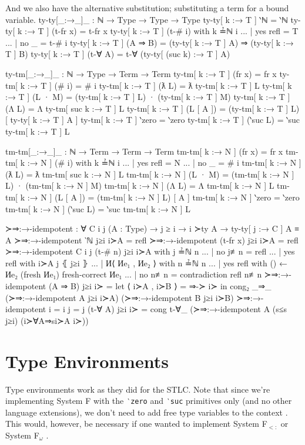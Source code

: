 \documentclass[logo,bsc,singlespacing,parskip,online]{infthesis}
\renewenvironment{code}{\mintedcopy[breaklines,breaksymbolleft=\;]{agda}}{\endmintedcopy}
\begin{document}
And we also have the alternative substitution; substituting a term for a bound variable.
\begin{code}
  ty-ty[_:→_]_ : ℕ → Type → Type → Type
  ty-ty[ k :→ T ] ‵ℕ = ‵ℕ
  ty-ty[ k :→ T ] (t-fr x) = t-fr x
  ty-ty[ k :→ T ] (t-# i) with k ≟ℕ i
  ... | yes refl = T
  ... | no  _    = t-# i
  ty-ty[ k :→ T ] (A ⇒ B) = (ty-ty[ k :→ T ] A) ⇒ (ty-ty[ k :→ T ] B)
  ty-ty[ k :→ T ] (t-∀ A) = t-∀ (ty-ty[ (suc k) :→ T ] A)

  ty-tm[_:→_]_ : ℕ → Type → Term → Term
  ty-tm[ k :→ T ] (fr x) = fr x
  ty-tm[ k :→ T ] (# i) = # i
  ty-tm[ k :→ T ] (ƛ L) = ƛ ty-tm[ k :→ T ] L
  ty-tm[ k :→ T ] (L · M) = (ty-tm[ k :→ T ] L) · (ty-tm[ k :→ T ] M)
  ty-tm[ k :→ T ] (Λ L) = Λ ty-tm[ suc k :→ T ] L
  ty-tm[ k :→ T ] (L [ A ]) = (ty-tm[ k :→ T ] L) [ ty-ty[ k :→ T ] A ]
  ty-tm[ k :→ T ] ‵zero = ‵zero
  ty-tm[ k :→ T ] (‵suc L) = ‵suc ty-tm[ k :→ T ] L

  tm-tm[_:→_]_ : ℕ → Term → Term → Term
  tm-tm[ k :→ N ] (fr x) = fr x
  tm-tm[ k :→ N ] (# i) with k ≟ℕ i
  ... | yes refl = N
  ... | no  _    = # i
  tm-tm[ k :→ N ] (ƛ L) = ƛ tm-tm[ suc k :→ N ] L
  tm-tm[ k :→ N ] (L · M) = (tm-tm[ k :→ N ] L) · (tm-tm[ k :→ N ] M)
  tm-tm[ k :→ N ] (Λ L) = Λ tm-tm[ k :→ N ] L
  tm-tm[ k :→ N ] (L [ A ]) = (tm-tm[ k :→ N ] L) [ A ]
  tm-tm[ k :→ N ] ‵zero = ‵zero
  tm-tm[ k :→ N ] (‵suc L) = ‵suc tm-tm[ k :→ N ] L

  ≻⇒:→-idempotent : ∀ {C i j}
    (A : Type)
    → j ≥ i
    → i ≻ty A
    → ty-ty[ j :→ C ] A ≡ A
  ≻⇒:→-idempotent ‵ℕ j≥i i≻A = refl
  ≻⇒:→-idempotent (t-fr x) j≥i i≻A = refl
  ≻⇒:→-idempotent {C} {i} {j} (t-# n) j≥i i≻A with j ≟ℕ n
  ... | no  j≢n  = refl
  ... | yes refl with i≻A j ⦃ j≥i ⦄
  ...   | И⟨ Иe₁ , Иe₂ ⟩ with n ≟ℕ n
  ...     | yes refl with () ← Иe₂ (fresh Иe₁) {fresh-correct Иe₁}
  ...     | no  n≢n  = contradiction refl n≢n
  ≻⇒:→-idempotent (A ⇒ B) j≥i i≻ = let ⟨ i≻A , i≻B ⟩ = ⇒-≻ i≻
    in cong₂ _⇒_ (≻⇒:→-idempotent A j≥i i≻A) (≻⇒:→-idempotent B j≥i i≻B)
  ≻⇒:→-idempotent {i = i} {j = j} (t-∀ A) j≥i i≻ = cong t-∀_
    (≻⇒:→-idempotent A (s≤s j≥i) (i≻∀A⇒si≻A i≻))
\end{code}

\section{Type Environments}
Type environments work as they did for the STLC. Note that since we're implementing System F with
the \texttt{‵zero} and \texttt{‵suc} primitives only (and no other language extensions), we don't
need to add free type variables to the context \citep{pierce_types_2002}. This would, however, be
necessary if one wanted to implement System F$_{<:}$ \citep{chargueraud_locally_2012} or System
F$_{\omega}$ \citep{hutton_system_2019}.
\end{document}
